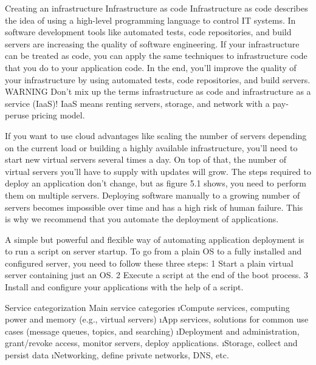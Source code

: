 \begin{frame}{Creating an infrastructure}
    Infrastructure as code
Infrastructure as code describes the idea of using a high-level programming language to
control IT systems. In software development tools like automated tests, code repositories,
and build servers are increasing the quality of software engineering. If your infrastructure
can be treated as code, you can apply the same techniques to infrastructure
code that you do to your application code. In the end, you’ll improve the quality of
your infrastructure by using automated tests, code repositories, and build servers.
WARNING Don’t mix up the terms infrastructure as code and infrastructure as a
service (IaaS)! IaaS means renting servers, storage, and network with a pay-peruse
pricing model.

If you want to use cloud advantages like scaling the number of servers depending on
the current load or building a highly available infrastructure, you’ll need to start new
virtual servers several times a day. On top of that, the number of virtual servers you’ll
have to supply with updates will grow. The steps required to deploy an application
don’t change, but as figure 5.1 shows, you need to perform them on multiple servers.
Deploying software manually to a growing number of servers becomes impossible over
time and has a high risk of human failure. This is why we recommend that you automate
the deployment of applications.

A simple but powerful and flexible way of automating application deployment is to
run a script on server startup. To go from a plain OS to a fully installed and configured
server, you need to follow these three steps:
1 Start a plain virtual server containing just an OS.
2 Execute a script at the end of the boot process.
3 Install and configure your applications with the help of a script.
\end{frame}

\begin{frame}{Service categorization}
Main service categories
\i Compute services, computing power and memory (e.g., virtual servers)
\i App services, solutions for common use cases (message queues, topics, and searching)
\i Deployment and administration, grant/revoke access, monitor servers, deploy applications.
\i Storage, collect and persist data
\i Networking, define private networks, DNS, etc.
\end{frame}

